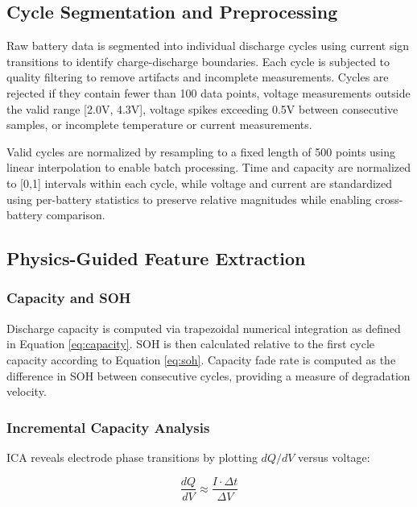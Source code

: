\documentclass{sn-jnl}
\begin{document}
\subsection{Cycle Segmentation and Preprocessing}
\label{subsec:segmentation}

Raw battery data is segmented into individual discharge cycles using current sign transitions to identify charge-discharge boundaries. Each cycle is subjected to quality filtering to remove artifacts and incomplete measurements. Cycles are rejected if they contain fewer than 100 data points, voltage measurements outside the valid range [2.0V, 4.3V], voltage spikes exceeding 0.5V between consecutive samples, or incomplete temperature or current measurements.

Valid cycles are normalized by resampling to a fixed length of 500 points using linear interpolation to enable batch processing. Time and capacity are normalized to [0,1] intervals within each cycle, while voltage and current are standardized using per-battery statistics to preserve relative magnitudes while enabling cross-battery comparison.

\subsection{Physics-Guided Feature Extraction}
\label{subsec:features}

\subsubsection{Capacity and SOH}
\label{subsubsec:capacity}

Discharge capacity is computed via trapezoidal numerical integration as defined in Equation \ref{eq:capacity}. SOH is then calculated relative to the first cycle capacity according to Equation \ref{eq:soh}. Capacity fade rate is computed as the difference in SOH between consecutive cycles, providing a measure of degradation velocity.

\subsubsection{Incremental Capacity Analysis}
\label{subsubsec:ica}

ICA reveals electrode phase transitions by plotting $dQ/dV$ versus voltage:

\begin{equation}
\label{eq:ica}
    \frac{dQ}{dV} \approx \frac{I \cdot \Delta t}{\Delta V}
\end{equation}
\end{document}

